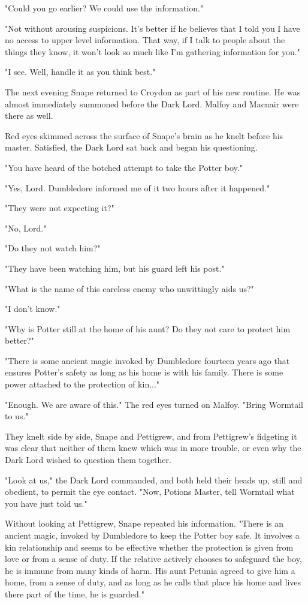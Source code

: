 \documentclass[a4paper,11pt]{article}
\begin{document}
"Could you go earlier? We could use the information."

"Not without arousing suspicions. It's better if he believes that I told you I have no access to upper level information. That way, if I talk to people about the things they know, it won't look so much like I'm gathering information for you."

"I see. Well, handle it as you think best."

The next evening Snape returned to Croydon as part of his new routine. He was almost immediately summoned before the Dark Lord. Malfoy and Macnair were there as well.

Red eyes skimmed across the surface of Snape's brain as he knelt before his master. Satisfied, the Dark Lord sat back and began his questioning.

"You have heard of the botched attempt to take the Potter boy."

"Yes, Lord. Dumbledore informed me of it two hours after it happened."

"They were not expecting it?"

"No, Lord."

"Do they not watch him?"

"They have been watching him, but his guard left his post."

"What is the name of this careless enemy who unwittingly aids us?"

"I don't know."

"Why is Potter still at the home of his aunt? Do they not care to protect him better?"

"There is some ancient magic invoked by Dumbledore fourteen years ago that ensures Potter's safety as long as his home is with his family. There is some power attached to the protection of kin..."

"Enough. We are aware of this." The red eyes turned on Malfoy. "Bring Wormtail to us."

They knelt side by side, Snape and Pettigrew, and from Pettigrew's fidgeting it was clear that neither of them knew which was in more trouble, or even why the Dark Lord wished to question them together.

"Look at us," the Dark Lord commanded, and both held their heads up, still and obedient, to permit the eye contact. "Now, Potions Master, tell Wormtail what you have just told us."

Without looking at Pettigrew, Snape repeated his information. "There is an ancient magic, invoked by Dumbledore to keep the Potter boy safe. It involves a kin relationship and seems to be effective whether the protection is given from love or from a sense of duty. If the relative actively chooses to safeguard the boy, he is immune from many kinds of harm. His aunt Petunia agreed to give him a home, from a sense of duty, and as long as he calls that place his home and lives there part of the time, he is guarded."
\end{document}
